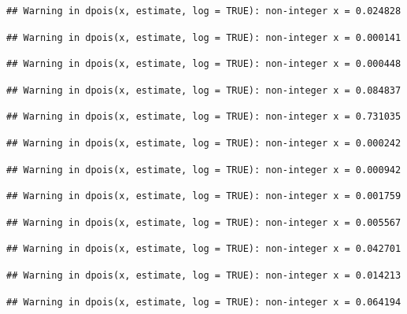 \documentclass[]{article}
\begin{document}
\begin{verbatim}
## Warning in dpois(x, estimate, log = TRUE): non-integer x = 0.024828
\end{verbatim}

\begin{verbatim}
## Warning in dpois(x, estimate, log = TRUE): non-integer x = 0.000141
\end{verbatim}

\begin{verbatim}
## Warning in dpois(x, estimate, log = TRUE): non-integer x = 0.000448
\end{verbatim}

\begin{verbatim}
## Warning in dpois(x, estimate, log = TRUE): non-integer x = 0.084837
\end{verbatim}

\begin{verbatim}
## Warning in dpois(x, estimate, log = TRUE): non-integer x = 0.731035
\end{verbatim}

\begin{verbatim}
## Warning in dpois(x, estimate, log = TRUE): non-integer x = 0.000242
\end{verbatim}

\begin{verbatim}
## Warning in dpois(x, estimate, log = TRUE): non-integer x = 0.000942
\end{verbatim}

\begin{verbatim}
## Warning in dpois(x, estimate, log = TRUE): non-integer x = 0.001759
\end{verbatim}

\begin{verbatim}
## Warning in dpois(x, estimate, log = TRUE): non-integer x = 0.005567
\end{verbatim}

\begin{verbatim}
## Warning in dpois(x, estimate, log = TRUE): non-integer x = 0.042701
\end{verbatim}

\begin{verbatim}
## Warning in dpois(x, estimate, log = TRUE): non-integer x = 0.014213
\end{verbatim}

\begin{verbatim}
## Warning in dpois(x, estimate, log = TRUE): non-integer x = 0.064194
\end{verbatim}
\end{document}
